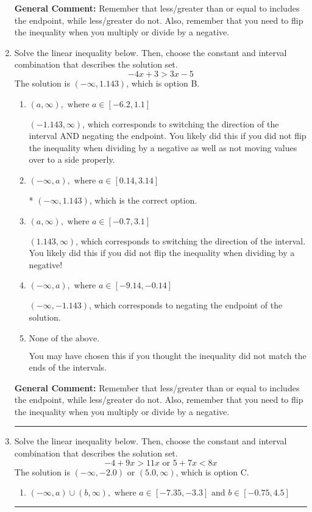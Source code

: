 \documentclass{extbook}[14pt]
\newcommand{\litem}[1]{\item #1

\rule{\textwidth}{0.4pt}}
\begin{document}
\begin{enumerate}
{\textbf{General Comment:} Remember that less/greater than or equal to includes the endpoint, while less/greater do not. Also, remember that you need to flip the inequality when you multiply or divide by a negative.
}
\litem{
Solve the linear inequality below. Then, choose the constant and interval combination that describes the solution set.
\[ -4x + 3 > 3x -5 \]The solution is \( (-\infty, 1.143) \), which is option B.\begin{enumerate}[label=\Alph*.]
\item \( (a, \infty), \text{ where } a \in [-6.2, 1.1] \)

 $(-1.143, \infty)$, which corresponds to switching the direction of the interval AND negating the endpoint. You likely did this if you did not flip the inequality when dividing by a negative as well as not moving values over to a side properly.
\item \( (-\infty, a), \text{ where } a \in [0.14, 3.14] \)

* $(-\infty, 1.143)$, which is the correct option.
\item \( (a, \infty), \text{ where } a \in [-0.7, 3.1] \)

 $(1.143, \infty)$, which corresponds to switching the direction of the interval. You likely did this if you did not flip the inequality when dividing by a negative!
\item \( (-\infty, a), \text{ where } a \in [-9.14, -0.14] \)

 $(-\infty, -1.143)$, which corresponds to negating the endpoint of the solution.
\item \( \text{None of the above}. \)

You may have chosen this if you thought the inequality did not match the ends of the intervals.
\end{enumerate}

\textbf{General Comment:} Remember that less/greater than or equal to includes the endpoint, while less/greater do not. Also, remember that you need to flip the inequality when you multiply or divide by a negative.
}
\litem{
Solve the linear inequality below. Then, choose the constant and interval combination that describes the solution set.
\[ -4 + 9 x > 11 x \text{ or } 5 + 7 x < 8 x \]The solution is \( (-\infty, -2.0) \text{ or } (5.0, \infty) \), which is option C.\begin{enumerate}[label=\Alph*.]
\item \( (-\infty, a) \cup (b, \infty), \text{ where } a \in [-7.35, -3.3] \text{ and } b \in [-0.75, 4.5] \)


\end{enumerate}}
\end{enumerate}
\end{document}
